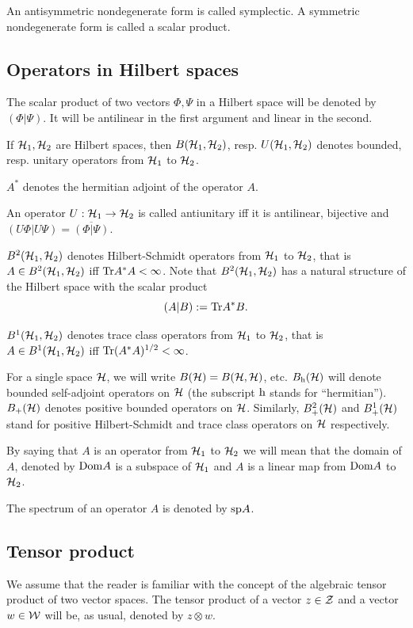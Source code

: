 \documentclass{svmult}
\def\bar{\overline}
\def\sp{{\rm sp}}
\def\h{{\rm h}}
\def\cZ{{\cal Z}}
\def\cW{{\cal W}}
\def\Dom{{\rm Dom}}
\def\Tr{{\rm Tr}}
\def\cH{{\cal H}}
\def\Tr{{\rm Tr}}
\def\cH{{\cal H}}
\begin{document}
An antisymmetric nondegenerate form is called symplectic.
A symmetric nondegenerate form is called a scalar product.

\subsection{Operators in Hilbert spaces}


The
  scalar
 product of two vectors $\Phi,\Psi$ in a Hilbert space will be denoted by
$(\Phi|\Psi)$. It will be antilinear in the first argument
 and linear in the
  second. 
 

If $\cH_1,\cH_2$ are Hilbert spaces, then $B(\cH_1,\cH_2)$, resp.
 $U(\cH_1,\cH_2)$
 denotes bounded, resp. unitary operators from $\cH_1$ to $\cH_2$.

$A^*$ denotes the hermitian adjoint of the operator $A$.

An operator $U:\cH_1\to\cH_2$ is called antiunitary iff it is antilinear,
bijective and $(U\Phi|U\Psi)=\bar{(\Phi|\Psi)}$.


$B^2(\cH_1,\cH_2)$ denotes Hilbert-Schmidt operators from $\cH_1$ to $\cH_2$,
 that is $A\in B^2(\cH_1,\cH_2)$ iff $\Tr A^*A<\infty$. Note that
 $B^2(\cH_1,\cH_2)$ has a natural structure of the  Hilbert space with the
 scalar product
\[(A|B):=\Tr A^*B.\]

$B^1(\cH_1,\cH_2)$ denotes trace  class operators from $\cH_1$ to $\cH_2$,
 that is $A\in B^1(\cH_1,\cH_2)$ iff $\Tr (A^*A)^{1/2}<\infty$.



 For a single
 space $\cH$, we will write $B(\cH)=B(\cH,\cH)$, etc. 
 $B_\h(\cH)$ will denote bounded self-adjoint operators on $\cH$
(the subscript $\h$ stands for ``hermitian'').
$B_+(\cH)$ denotes positive bounded operators on $\cH$. 
Similarly,  $B_+^2(\cH)$ and 
$B_+^1(\cH)$ stand for positive Hilbert-Schmidt and
 trace class operators on $\cH$ respectively.

By saying that $A$ is an operator from $\cH_1$ to $\cH_2$ we will mean 
that the domain  of $A$, denoted by $\Dom A$ is a subspace of $\cH_1$
and $A$ is a linear map from $\Dom A$ to $\cH_2$.

The spectrum of an operator $A$ is denoted by $\sp A$. 



\subsection{Tensor product}
\label{s5.1}
We assume that the reader is familiar with the concept of the algebraic tensor
product of two vector spaces. The tensor product of a vector $z\in\cZ$ and a
vector $w\in\cW$ will be, as usual,  denoted by $z\otimes w$. 
\end{document}
